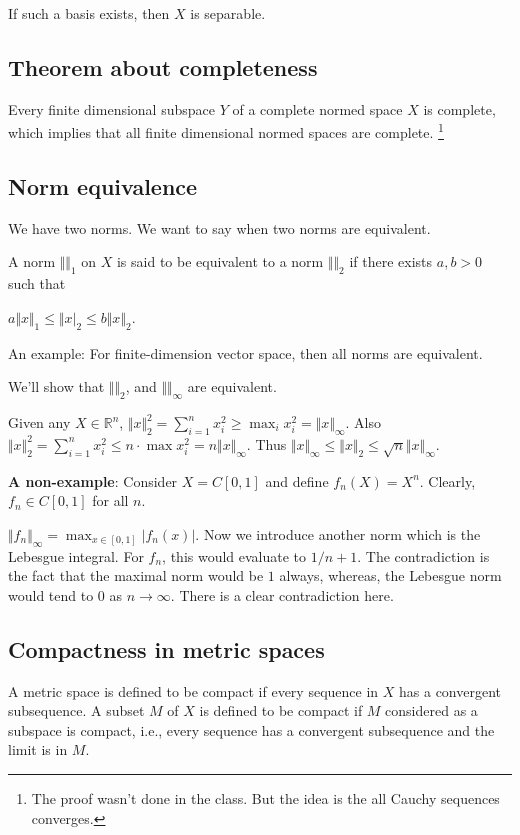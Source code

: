 \documentclass[11pt]{article}
\def\R{\mathbb{R}}
\begin{document}
If such a basis exists, then \(X\) is separable.
\subsection{Theorem about completeness}
\label{sec:org13e345e}
Every finite dimensional subspace \(Y\) of a complete normed space \(X\) is
complete, which implies that all finite dimensional normed spaces are
complete. \footnote{The proof wasn't done in the class. But the idea is the all Cauchy
sequences converges.}
\subsection{Norm equivalence}
\label{sec:org167a9df}
We have two norms. We want to say when two norms are equivalent.

A norm \(\Vert \Vert_1\) on \(X\) is said to be equivalent to a norm \(\Vert
   \Vert_2\) if there exists \(a, b > 0\) such that

\(a \Vert x \Vert_1 \le \Vert x \vert_2 \le b \Vert x \Vert_2\).

An example: For finite-dimension vector space, then all norms are equivalent.

We'll show that \(\Vert \Vert_2\), and \(\Vert \Vert_\infty\) are equivalent.

Given any \(X \in \R^n\), \(\Vert x\Vert_2^2 = \sum_{i=1}^{n} x_i^2 \ge \max_i
   x_i^2 = \Vert x\Vert_\infty\). Also \(\Vert x \Vert_2^2 = \sum_{i=1}^{n} x_i^2
   \le n \cdot \max x_i^2 = n \Vert x \Vert_\infty\). Thus \(\Vert x \Vert_\infty
   \le \Vert x\Vert_2 \le \sqrt{n}\Vert x \Vert_\infty\).

\textbf{A non-example}: Consider \(X = C[0, 1]\) and define \(f_n(X) = X^n\). Clearly,
\(f_n \in C[0, 1]\) for all \(n\).

\(\Vert f_n \Vert_\infty = \max_{x\in [0, 1]} \vert f_n(x)\vert\). Now we
introduce another norm which is the Lebesgue integral. For \(f_n\), this would
evaluate to \(1/{n+1}\). The contradiction is the fact that the maximal norm
would be \(1\) always, whereas, the Lebesgue norm would tend to \(0\) as
\(n\rightarrow \infty\). There is a clear contradiction here.
\subsection{Compactness in metric spaces}
\label{sec:orge721d44}
A metric space is defined to be compact if every sequence in \(X\) has a
convergent subsequence. A subset \(M\) of \(X\) is defined to be compact if \(M\)
considered as a subspace is compact, i.e., every sequence has a convergent
subsequence and the limit is in \(M\).
\end{document}
